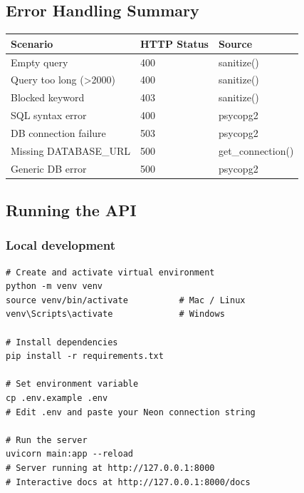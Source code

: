 \documentclass[12pt, a4paper]{article}
\begin{document}
\subsection{Error Handling Summary}

\begin{center}
\begin{tabular}{lll}
  \toprule
  \textbf{Scenario}          & \textbf{HTTP Status} & \textbf{Source} \\
  \midrule
  Empty query                & 400                  & sanitize() \\
  Query too long (>2000)     & 400                  & sanitize() \\
  Blocked keyword            & 403                  & sanitize() \\
  SQL syntax error           & 400                  & psycopg2 \\
  DB connection failure      & 503                  & psycopg2 \\
  Missing DATABASE\_URL      & 500                  & get\_connection() \\
  Generic DB error           & 500                  & psycopg2 \\
  \bottomrule
\end{tabular}
\end{center}

\subsection{Running the API}

\subsubsection{Local development}

\begin{lstlisting}[style=bashstyle, caption={Local setup commands}]
# Create and activate virtual environment
python -m venv venv
source venv/bin/activate          # Mac / Linux
venv\Scripts\activate             # Windows

# Install dependencies
pip install -r requirements.txt

# Set environment variable
cp .env.example .env
# Edit .env and paste your Neon connection string

# Run the server
uvicorn main:app --reload
# Server running at http://127.0.0.1:8000
# Interactive docs at http://127.0.0.1:8000/docs
\end{lstlisting}
\end{document}
